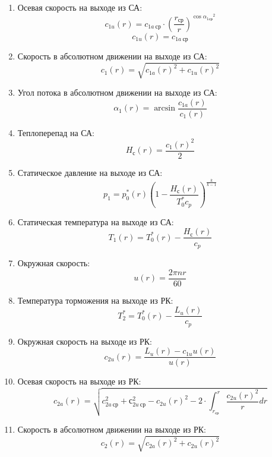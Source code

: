 \documentclass[a4paper,10pt]{article}
\begin{document}
\begin{enumerate}
        \item Осевая скорость на выходе из СА:
        \[
            c_{1u}(r) = c_{1a\ ср} \cdot \left( \frac{r_{ср}}{r} \right) ^
                {\cos{\alpha_{1ср}} ^ 2}
        \]
        \[
            c_{1u}(r) = c_{1a\ ср}
        \]

        \item Скорость в абсолютном движении на выходе из СА:
        \[
            c_1(r) = \sqrt{c_{1a}(r)^2 + c_{1u}(r)^2}
        \]

        \item Угол потока в абсолютном движении на выходе из СА:
        \[
            \alpha_1 (r) = \arcsin{\frac{c_{1a}(r)}{c_1(r)}}
        \]

        \item Теплоперепад на СА:
        \[
            H_с (r) = \frac{c_1(r) ^ 2}{2}
        \]

        \item Статическое давление на выходе из СА:
        \[
            p_1 = p_0^*(r) \left( 1 - \frac{H_с (r)}{T_0^* c_p} \right) ^ {\frac{k}{k - 1}}
        \]

        \item Статическая температура на выходе из СА:
        \[
            T_1 (r) = T_0^*(r) - \frac{H_с (r)}{c_p}
        \]

        \item Окружная скорость:
        \[
            u(r) = \frac{2 \pi n r}{60}
        \]

        \item Температура торможения на выходе из РК:
        \[
            T_2^* = T_0^*(r) - \frac{L_u (r)}{c_p}
        \]

        \item Окружная скорость на выходе из РК:
        \[
            c_{2u}(r) = \frac{L_u(r) - c_{1u} u(r)}{u(r)}
        \]

        \item Осевая скорость на выходе из РК:
        \[
            c_{2a}(r) = \sqrt{
                    c_{2a\ ср}^2 + с_{2u\ ср}^2 - c_{2u}(r)^2 -
                    2 \cdot \int_{r_{ср}}^{r} \frac{c_{2u}(r)^2}{r} dr
            }
        \]

        \item Скорость в абсолютном движении на выходе из РК:
        \[
            c_2(r) = \sqrt{c_{2a}(r)^2 + c_{2u}(r)^2}
        \]


\end{enumerate}
\end{document}
